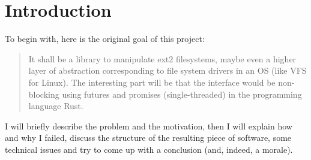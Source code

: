 \chapter{Introduction}

To begin with, here is the original goal of this project:

\begin{quote}
  It shall be a library to manipulate ext2 filesystems, maybe even a higher
  layer of abstraction corresponding to file system drivers in an OS (like VFS
  for Linux). The interesting part will be that the interface would be
  non-blocking using futures and promises (single-threaded) in the programming
  language Rust.
\end{quote}

I will briefly describe the problem and the motivation, then I will explain how
and why I failed, discuss the structure of the resulting piece of software,
some technical issues and try to come up with a conclusion (and, indeed, a
morale).
